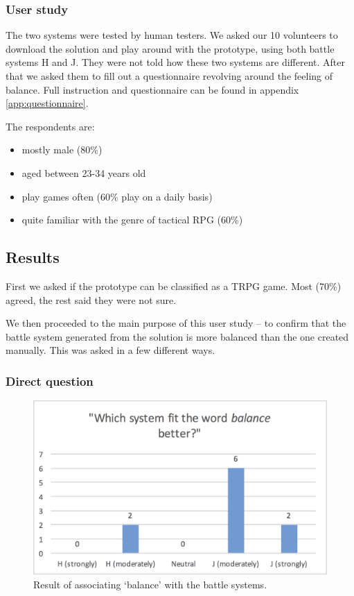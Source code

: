 \subsubsection*{User study}

The two systems were tested by human testers. We asked our 10 volunteers to download the solution and play around with the prototype, using both battle systems H and J. They were not told how these two systems are different. After that we asked them to fill out a questionnaire revolving around the feeling of balance. Full instruction and questionnaire can be found in appendix \ref{app:questionnaire}.

The respondents are:
\begin{itemize}
	\item mostly male (80\%)
	\item aged between 23-34 years old
	\item play games often (60\% play on a daily basis)
	\item quite familiar with the genre of tactical RPG (60\%)
\end{itemize}

\subsection{Results}

First we asked if the prototype can be classified as a TRPG game. Most (70\%) agreed, the rest said they were not sure.

We then proceeded to the main purpose of this user study -- to confirm that the battle system generated from the solution is more balanced than the one created manually. This was asked in a few different ways.

\subsubsection*{Direct question}

\begin{figure}
	\centering
	\includegraphics[width=0.6\linewidth]{figures/bar_balanced}
	\caption{Result of associating `balance' with the battle systems.}
	\label{fig:result_bar_balance}
\end{figure}

